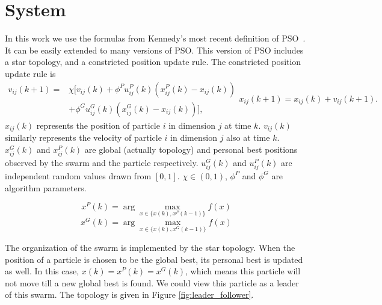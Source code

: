 \section{System}
\label{sec:system}

In this work we use the formulas from Kennedy's most recent definition of PSO~\cite{4223164}.
It can be easily extended to many versions of PSO.
This version of PSO includes a star topology, and a constricted position update rule. 
The constricted position update rule is
\begin{subequations}
\label{eq:pso_alg}
\begin{equation}
\label{eq:up_vel}
\begin{aligned}
v_{ij}(k+1) = &  \chi [ v_{ij}(k) 
 + \phi^{P} u^{P}_{ij}(k) (x^{P}_{ij}(k) - x_{ij}(k))\\
 & + \phi^{G} u^{G}_{ij}(k) ( x^{G}_{ij}(k) - x_{ij}(k)) ],
\end{aligned}
\end{equation}
\begin{equation}
\label{eq:up_pos}
x_{ij}(k+1) = x_{ij}(k) + v_{ij}(k+1).
\end{equation}
\end{subequations}
$ x_{ij}(k) $ represents the position of particle $ i $ in dimension $ j $ at time $ k $.
$ v_{ij}(k) $ similarly represents the velocity of particle $ i $ in dimension $ j $ also at time $ k $.
$ x^{G}_{ij}(k) $ and $ x^{P}_{ij}(k) $ are global (actually topology) and personal best positions observed by the swarm and the particle respectively. 
$ u^{G}_{ij}(k) $ and $ u^{P}_{ij}(k) $ are independent random values drawn from $ [0,1] $.
$ \chi \in ( 0, 1 ) $, $ \phi^{P} $ and $ \phi^{G} $ are algorithm parameters.

\begin{equation}
\label{eq:pb_up}
x^{P}(k) = \arg \max_{ x \in \{ x(k), x^{P}(k-1) \} } f(x)
\end{equation}
\begin{equation}
\label{eq:gb_up}
x^{G}(k) = \arg \max_{ x \in \{ x(k), x^{G}(k-1) \} } f(x)
\end{equation}

The organization of the swarm is implemented by the star topology.
When the position of a particle is chosen to be the global best, its personal best is updated as well.
In this case, $ x(k) = x^{P}(k) = x^{G}(k) $, which means this particle will not move till a new global best is found.
We could view this particle as a leader of this swarm.
The topology is given in Figure \ref{fig:leader_follower}.

